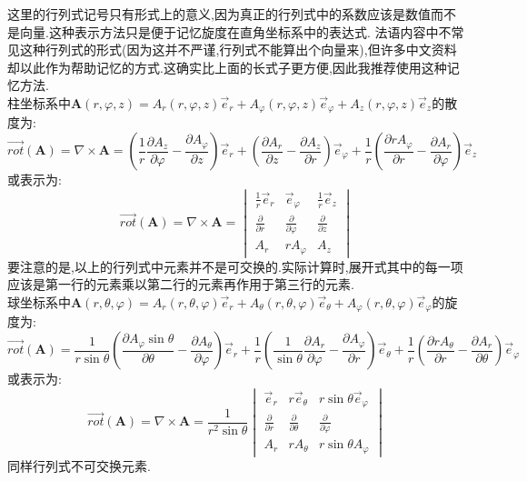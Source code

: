 \documentclass[12pt, a4paper, oneside]{ctexbook}
\begin{document}
    这里的行列式记号只有形式上的意义,因为真正的行列式中的系数应该是数值而不是向量.这种表示方法只是便于记忆旋度在直角坐标系中的表达式.
    法语内容中不常见这种行列式的形式(因为这并不严谨,行列式不能算出个向量来),但许多中文资料却以此作为帮助记忆的方式.这确实比上面的长式子更方便,因此我推荐使用这种记忆方法.\\


    柱坐标系中$\textbf{A}(r,\varphi ,z)=A_r(r,\varphi ,z)\vec{e}_r+A_\varphi(r,\varphi ,z)\vec{e}_\varphi+A_z(r,\varphi ,z)\vec{e}_z$的散度为:
    $$
    \overrightarrow{rot} (\textbf{A})=\nabla\times \textbf{A}=(\frac{1}{r}\frac{\partial A_z}{\partial \varphi}-\frac{\partial A_\varphi}{\partial z})\vec{e}_r+
    (\frac{\partial A_r}{\partial z}-\frac{\partial A_z}{\partial r})\vec{e}_\varphi+\frac{1}{r}(\frac{\partial rA_\varphi}{\partial r}-\frac{\partial A_r}{\partial \varphi})\vec{e}_z
    $$
    或表示为:
    $$
    \overrightarrow{rot} (\textbf{A})=\nabla\times \textbf{A}=
    \begin{vmatrix}
      \frac{1}{r} \vec{e}_r&\vec{e}_\varphi  &\frac{1}{r}\vec{e}_z \\
      \frac{\partial }{\partial r}& \frac{\partial }{\partial \varphi} &\frac{\partial }{\partial z} \\
      A_r& rA_\varphi &A_z
    \end{vmatrix}
    $$
    要注意的是,以上的行列式中元素并不是可交换的.实际计算时,展开式其中的每一项应该是第一行的元素乘以第二行的元素再作用于第三行的元素.\\


    球坐标系中$\textbf{A}(r,\theta ,\varphi)=A_r(r,\theta ,\varphi)\vec{e}_r+A_\theta(r,\theta ,\varphi)\vec{e}_\theta+A_\varphi(r,\theta ,\varphi)\vec{e}_\varphi$的旋度为:
    $$
    \overrightarrow{rot} (\textbf{A})=
      \frac{1}{r\sin\theta}(\frac{\partial A_\varphi \sin\theta}{\partial \theta}-\frac{\partial A_\theta}{\partial \varphi})\vec{e}_r+
      \frac{1}{r}(\frac{1}{\sin\theta}\frac{\partial A_r}{\partial \varphi}-\frac{\partial A_\varphi}{\partial r})\vec{e}_\theta+\frac{1}{r}(\frac{\partial rA_\theta}{\partial r}-\frac{\partial A_r}{\partial \theta})\vec{e}_\varphi 
    $$
    或表示为:
    $$
    \overrightarrow{rot} (\textbf{A})=\nabla\times \textbf{A}=
    \frac{1}{r^2\sin\theta} 
    \begin{vmatrix}
      \vec{e}_r&r\vec{e}_\theta  &r\sin\theta\vec{e}_\varphi \\
      \frac{\partial }{\partial r}& \frac{\partial }{ \partial \theta} &\frac{\partial }{\partial \varphi} \\
      A_r& rA_\theta &r\sin\theta A_\varphi
    \end{vmatrix}
    $$
    同样行列式不可交换元素.
\end{document}
